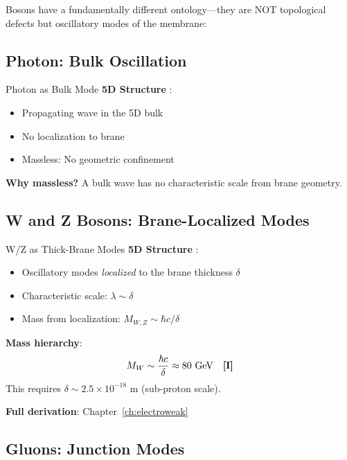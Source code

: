 Bosons have a fundamentally different ontology---they are NOT topological defects
but oscillatory modes of the membrane:

\subsection{Photon: Bulk Oscillation}

\begin{mechanism}{Photon as Bulk Mode}
\textbf{5D Structure} \tagP{}:
\begin{itemize}[nosep]
\item Propagating wave in the 5D bulk
\item No localization to brane
\item Massless: No geometric confinement
\end{itemize}

\textbf{Why massless?}
A bulk wave has no characteristic scale from brane geometry.
\end{mechanism}

\subsection{W and Z Bosons: Brane-Localized Modes}

\begin{mechanism}{W/Z as Thick-Brane Modes}
\textbf{5D Structure} \tagP{}:
\begin{itemize}[nosep]
\item Oscillatory modes \textit{localized} to the brane thickness $\delta$
\item Characteristic scale: $\lambda \sim \delta$
\item Mass from localization: $M_{W,Z} \sim \hbar c / \delta$
\end{itemize}

\textbf{Mass hierarchy}:
\begin{equation}
M_W \sim \frac{\hbar c}{\delta} \approx 80 \text{ GeV} \quad \textbf{[I]}
\end{equation}
This requires $\delta \sim 2.5 \times 10^{-18}$ m (sub-proton scale).

\textbf{Full derivation}: Chapter~\ref{ch:electroweak}
\end{mechanism}

\subsection{Gluons: Junction Modes}


